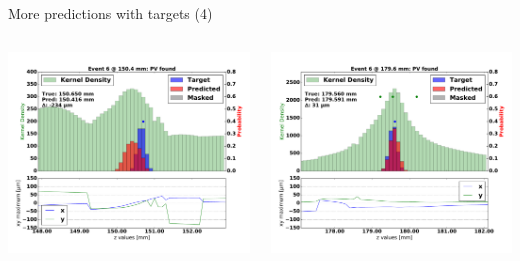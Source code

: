 \begin{frame}{More predictions with targets (4)}
  \begin{columns}[c]
        \begin{center}
           \includegraphics[width=1\textwidth, trim=60 0 60 0]{images/07Jan19_AltCNN4Layer_D35_sp_35.pdf}
        \end{center}
        \begin{center}
           \includegraphics[width=1\textwidth, trim=60 0 60 0]{images/07Jan19_AltCNN4Layer_D35_sp_36.pdf}
       \end{center}
  \end{columns}
\end{frame}
